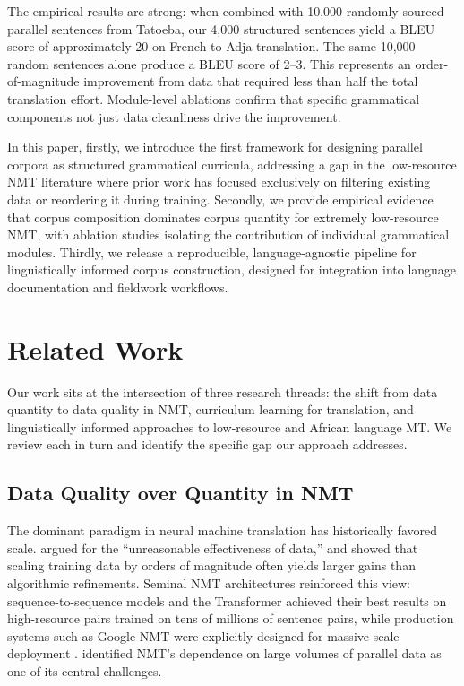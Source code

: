 \documentclass[11pt]{article}
\begin{document}
The empirical results are strong: when combined with 10,000 randomly sourced parallel sentences from Tatoeba, our 4,000 structured sentences yield a BLEU score of approximately 20 on French to Adja translation. The same 10,000 random sentences alone produce a BLEU score of 2--3. This represents an order-of-magnitude improvement from data that required less than half the total translation effort. Module-level ablations confirm that specific grammatical components not just data cleanliness drive the improvement.



In this paper, firstly, we introduce the first framework for designing parallel corpora as structured grammatical curricula, addressing a gap in the low-resource NMT literature where prior work has focused exclusively on filtering existing data or reordering it during training. Secondly, we provide empirical evidence that corpus composition dominates corpus quantity for extremely low-resource NMT, with ablation studies isolating the contribution of individual grammatical modules. Thirdly, we release a reproducible, language-agnostic pipeline for linguistically informed corpus construction, designed for integration into language documentation and fieldwork workflows.

\section{Related Work}
\label{sec:related-work}

Our work sits at the intersection of three research threads: the shift from data quantity to data quality in NMT, curriculum learning for translation, and linguistically informed approaches to low-resource and African language MT. We review each in turn and identify the specific gap our approach addresses.

\subsection{Data Quality over Quantity in NMT}

The dominant paradigm in neural machine translation has historically favored scale. \citet{halevy2009unreasonable} argued for the ``unreasonable effectiveness of data,'' and \citet{banko2001scaling} showed that scaling training data by orders of magnitude often yields larger gains than algorithmic refinements. Seminal NMT architectures reinforced this view: sequence-to-sequence models \citep{sutskever2014sequence} and the Transformer \citep{vaswani2017attention} achieved their best results on high-resource pairs trained on tens of millions of sentence pairs, while production systems such as Google NMT were explicitly designed for massive-scale deployment \citep{wu2016google}. \citet{koehn2017six} identified NMT's dependence on large volumes of parallel data as one of its central challenges.
\end{document}

